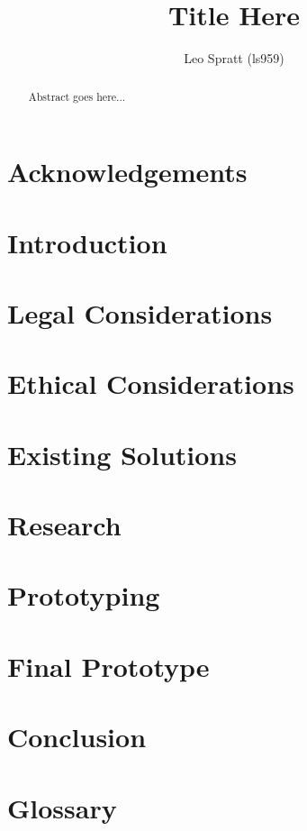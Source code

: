 \documentclass[a4paper,12pt]{report}
\title{
    {Title Here}\\
}
\author{Leo Spratt (ls959)}
\begin{document}
\maketitle

\begin{abstract}
    Abstract goes here...
\end{abstract}
\chapter{Acknowledgements}
% 
\tableofcontents
\newpage
\listoffigures
\newpage
\listoftables
\newpage
\chapter{Introduction}
\chapter{Legal Considerations}
\chapter{Ethical Considerations}
\chapter{Existing Solutions}

\chapter{Research}

\chapter{Prototyping}

\chapter{Final Prototype}

\chapter{Conclusion}

\printbibliography[heading=bibintoc]

\appendix
\chapter{Glossary}
\end{document}
